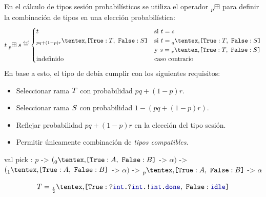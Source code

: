 \begin{frame}{\insertsection}
	En el cálculo de tipos sesión probabilísticos se utiliza el operador
	$\mathrel{\prescript{}{p}{\boxplus}}$ para definir la combinación de tipos en una elección probabilística:
	\begin{equation*}
	    \csum{t}{s}
	    \eqdef
	    \begin{cases}
	      t & \text{si $t = s$}
	      \\
	      \BinaryPChoice[pq+(1-p)r]{\SessionTypeT}{\SessionTypeS} & \text{si $t = \BinaryPChoice[q]{\SessionTypeT}{\SessionTypeS}$} \\ & \text{y $s = \BinaryPChoice[r]{\SessionTypeT}{\SessionTypeS}$}
	      \\
	      \text{indefinido} & \text{caso contrario}
	    \end{cases}
	\end{equation*}
	\pause
	En base a esto, el tipo de  debía cumplir con los siguientes requisitos:
	\begin{itemize}
		\item Seleccionar rama $T$ con probabilidad $pq + (1 - p)r$.
		\item Seleccionar rama $S$ con probabilidad $1 - (pq + (1 - p)r)$.
		\item Reflejar probabilidad $pq + (1 - p)r$ en la elección del tipo sesión.
		\item Permitir únicamente combinación de \emph{tipos compatibles}.
	\end{itemize}
\end{frame}

\begin{frame}[fragile]{\insertsection}
	\begin{table}[htb]
	    \begin{OCamlD}[basicstyle=\scriptsize,frame=single]
              val pick : $p$ -> $(\BinaryPChoice[0]{\etvarA}{\etvarB}$ -> $\alpha)$
                           -> $(\BinaryPChoice[1]{\etvarA}{\etvarB}$ -> $\alpha)$
                           -> $\BinaryPChoice[p]{\etvarA}{\etvarB}$ -> $\alpha$
	    \end{OCamlD}
	\end{table}
	\CoinFlipSumServer[\footnotesize]

	\begin{equation*}
		\SessionType = \BinaryPChoice[\frac{1}{2}]{
			\In\tint{\In\tint{\Out\tint{\Done}}}
			}{\Idle}
	\end{equation*}
\end{frame}


